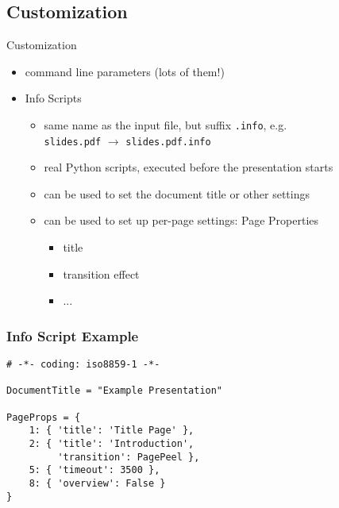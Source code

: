 \documentclass[bigger,hyperref={colorlinks=true,linkcolor=white,urlcolor=blue}]{beamer}
\begin{document}
\subsection{Customization}
\begin{frame}{Customization}
    \begin{itemize}
        \item command line parameters (lots of them!)
        \item {\glqq}Info Scripts{\grqq}
        \begin{itemize}
            \item same name as the input file, but suffix \texttt{.info}, e.g. \\
                  \texttt{slides.pdf} $\rightarrow$ \texttt{slides.pdf.info}
            \item real Python scripts, executed before the presentation starts
            \item can be used to set the document title or other settings
            \item can be used to set up per-page settings: {\glqq}Page
                  Properties{\grqq}
                \begin{itemize}
                    \item title
                    \item transition effect
                    \item ...
                \end{itemize}
        \end{itemize}
    \end{itemize}
\end{frame}
\begin{frame}[fragile]
\frametitle{Info Script Example}
\begin{verbatim}
# -*- coding: iso8859-1 -*-

DocumentTitle = "Example Presentation"

PageProps = {
    1: { 'title': 'Title Page' },
    2: { 'title': 'Introduction',
         'transition': PagePeel },
    5: { 'timeout': 3500 },
    8: { 'overview': False }
}
\end{verbatim}
\end{frame}
\end{document}
